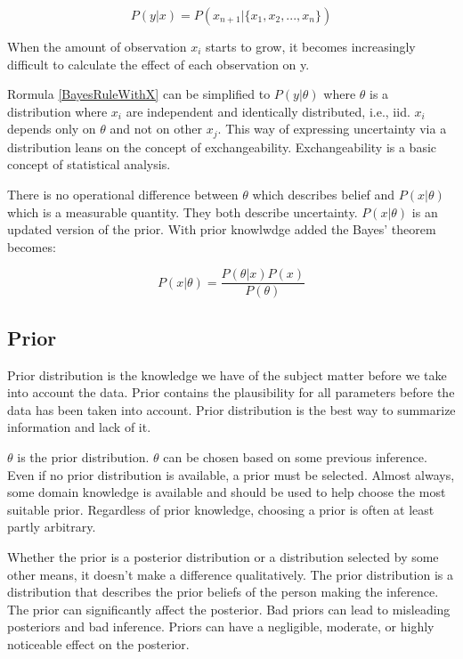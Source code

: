 \begin{equation}\label{BayesRuleWithX}
P(y|x) = P(x_{n + 1}|\{x_1, x_2, ..., x_n \})
\end{equation}

When the amount of observation $x_i$ starts to grow, it becomes increasingly difficult to calculate the effect of each observation on y. 

Rormula \ref{BayesRuleWithX} can be simplified to $P(y|\theta)$ where $\theta$ is a distribution where $x_i$ are independent and identically distributed, i.e., iid. $x_i$ depends only on $\theta$ and not on other $x_j$.\cite{Lindley1990The1W} This way of expressing uncertainty via a distribution leans on the concept of exchangeability. Exchangeability is a basic concept of statistical analysis. \cite{Gel2014BayesianDA}

There is no operational difference between $\theta$ which describes belief and $P(x|\theta)$ which is a measurable quantity. They both describe uncertainty. $P(x|\theta)$ is an updated version of the prior. With prior knowlwdge added the Bayes' theorem becomes:

\begin{equation}
P(x|\theta) = \frac{P(\theta|x)P(x)}{P(\theta)}
\end{equation}
\cite{Pawitan2002InAL}

\subsection{Prior}\label{Prior}

Prior distribution is the knowledge we have of the subject matter before we take into account the data.\cite{Box1973BayesianII} Prior contains the plausibility for all parameters before the data has been taken into account. \cite{Mcelreath2015StatisticalRA}\cite{Robert2007TheBC} Prior distribution is the best way to summarize information and lack of it.\cite{Robert2007TheBC}


$\theta$ is the prior distribution. $\theta$ can be chosen based on some previous inference. Even if no prior distribution is available, a prior must be selected. Almost always, some domain knowledge is available and should be used to help choose the most suitable prior.\cite{Mcelreath2015StatisticalRA} Regardless of prior knowledge, choosing a prior is often at least partly arbitrary.\cite{Robert2007TheBC}

Whether the prior is a posterior distribution or a distribution selected by some other means, it doesn't make a difference qualitatively. The prior distribution is a distribution that describes the prior beliefs of the person making the inference.\cite{Lindley1990The1W} The prior can significantly affect the posterior. Bad priors can lead to misleading posteriors and bad inference.\cite{Mcelreath2015StatisticalRA} Priors can have a negligible, moderate, or highly noticeable effect on the posterior.\cite{Robert2007TheBC}

